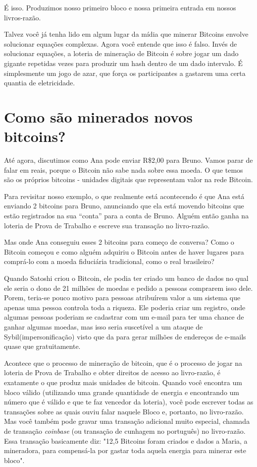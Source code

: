 É isso. Produzimos nosso primeiro bloco e nossa primeira entrada em nossos livros-razão.

Talvez você já tenha lido em algum lugar da mídia que minerar Bitcoins envolve solucionar equações complexas. Agora você entende que isso é falso. Invés de solucionar equações, a loteria de mineração de Bitcoin é sobre jogar um dado gigante repetidas vezes para produzir um hash dentro de um dado intervalo. É simplesmente um jogo de azar, que força os participantes a gastarem uma certa quantia de eletricidade. 

\section*{Como são minerados novos bitcoins?}

Até agora, discutimos como Ana pode enviar R\$2,00 para Bruno. Vamos parar de falar em reais, porque o Bitcoin não sabe nada sobre essa moeda. O que temos são os próprios bitcoins - unidades digitais que representam valor na rede Bitcoin.

Para revisitar nosso exemplo, o que realmente está acontecendo é que Ana está enviando 2 bitcoins para Bruno, anunciando que ela está movendo bitcoins que estão registrados na sua “conta” para a conta de Bruno. Alguém então ganha na loteria de Prova de Trabalho e escreve sua transação no livro-razão.

Mas onde Ana conseguiu esses 2 bitcoins para começo de conversa? Como o Bitcoin começou e como alguém adquiriu o Bitcoin antes de haver lugares para comprá-lo com a moeda fiduciária tradicional, como o real brasileiro?

Quando Satoshi criou o Bitcoin, ele podia ter criado um banco de dados no qual ele seria o dono de 21 milhões de moedas e pedido a pessoas comprarem isso dele. Porem, teria-se pouco motivo para pessoas atribuírem valor a um sistema que apenas uma pessoa controla toda a riqueza. Ele poderia criar um registro, onde algumas pessoas poderiam se cadastrar com um e-mail para ter uma chance de ganhar algumas moedas, mas isso seria suscetível a um ataque de Sybil(impersonificação) visto que da para gerar milhões de endereços de e-mails quase que gratuitamente.

Acontece que o processo de mineração de bitcoin, que é o processo de jogar na loteria de Prova de Trabalho e obter direitos de acesso ao livro-razão, é exatamente o que produz mais unidades de bitcoin. Quando você encontra um bloco válido (utilizando uma grande quantidade de energia e encontrando um número que é válido e que te faz vencedor da loteria), você pode escrever todas as transações sobre as quais ouviu falar naquele Bloco e, portanto, no livro-razão.%
Mas você também pode gravar uma transação adicional muito especial, chamada de transação \textit{coinbase} (ou transação de cunhagem no português) no livro-razão. Essa transação basicamente diz: "12,5 Bitcoins foram criados e dados a Maria, a mineradora, para compensá-la por gastar toda aquela energia para minerar este bloco".


